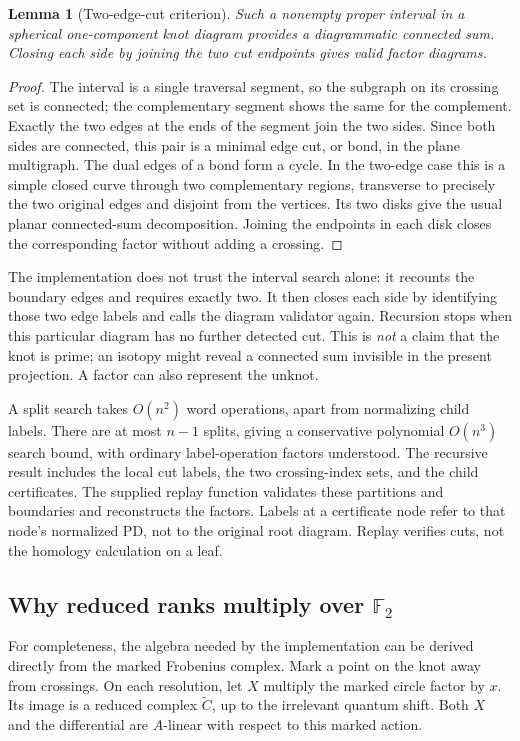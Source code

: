 \documentclass[11pt,letterpaper]{article}
\newtheorem{lemma}[theorem]{Lemma}
\theoremstyle{definition}
\newcommand{\F}{\mathbb F_2}
\begin{document}
\begin{lemma}[Two-edge-cut criterion]\label{lem:cut}
Such a nonempty proper interval in a spherical one-component knot diagram
provides a diagrammatic connected sum. Closing each side by joining the two
cut endpoints gives valid factor diagrams.
\end{lemma}
\begin{proof}
The interval is a single traversal segment, so the subgraph on its crossing set
is connected; the complementary segment shows the same for the complement.
Exactly the two edges at the ends of the segment join the two sides. Since both
sides are connected, this pair is a minimal edge cut, or bond, in the plane
multigraph. The dual edges of a bond form a cycle. In the two-edge case this is
a simple closed curve through two complementary regions, transverse to precisely
the two original edges and disjoint from the vertices. Its two disks give the
usual planar connected-sum decomposition. Joining the endpoints in each disk
closes the corresponding factor without adding a crossing.
\end{proof}

The implementation does not trust the interval search alone: it recounts the
boundary edges and requires exactly two. It then closes each side by identifying
those two edge labels and calls the diagram validator again. Recursion stops
when this particular diagram has no further detected cut. This is \emph{not} a
claim that the knot is prime; an isotopy might reveal a connected sum invisible
in the present projection. A factor can also represent the unknot.

A split search takes $O(n^2)$ word operations, apart from normalizing child
labels. There are at most $n-1$ splits, giving a conservative polynomial
$O(n^3)$ search bound, with ordinary label-operation factors understood. The
recursive result includes the local cut labels, the two crossing-index sets,
and the child certificates. The supplied replay function validates these
partitions and boundaries and reconstructs the factors. Labels at a certificate
node refer to that node's normalized PD, not to the original root diagram.
Replay verifies cuts, not the homology calculation on a leaf.

\subsection{Why reduced ranks multiply over \texorpdfstring{$\F$}{F2}}

For completeness, the algebra needed by the implementation can be derived
directly from the marked Frobenius complex. Mark a point on the knot away from
crossings. On each resolution, let $X$ multiply the marked circle factor by
$x$. Its image is a reduced complex $\widetilde C$, up to the irrelevant quantum
shift. Both $X$ and the differential are $A$-linear with respect to this marked
action.
\end{document}
